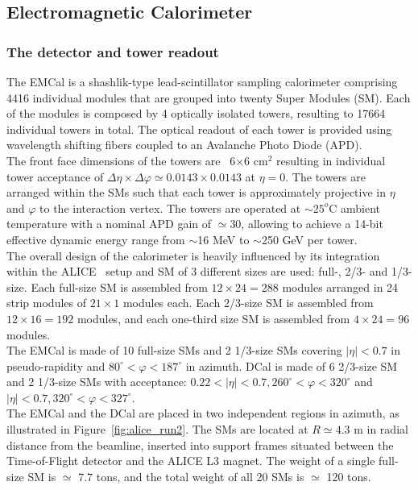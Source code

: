 \subsection{Electromagnetic Calorimeter}
%
\subsubsection{The detector and tower readout}
The EMCal is a shashlik-type lead-scintillator sampling calorimeter comprising 4416 individual modules that are grouped into 
twenty Super Modules (SM). Each of the modules is composed by 4 optically isolated towers, resulting to 17664 individual towers in total.  
The optical readout of each tower is provided using wavelength shifting fibers coupled to an Avalanche Photo Diode (APD). \\
%
The front face dimensions of the towers are ~6$\times$6 cm$^{2}$ resulting in individual tower acceptance of $\Delta  \eta \times \Delta  \varphi \simeq 0.0143 \times 0.0143$ at $\eta = 0$. The towers are arranged within the SMs such that each tower is approximately 
projective in $\eta$ and $\varphi$  to the interaction vertex. The towers are operated at $\sim25^{o}$C ambient temperature with a nominal APD gain of $\simeq$30, allowing to achieve a 14-bit effective dynamic energy range from $\sim$16 MeV to $\sim$250 GeV per tower. \\
%
The overall design of the calorimeter is heavily influenced by its integration within the ALICE~\cite{Aamodt:2008zz} setup and SM of 3 different sizes are used: full-, 2/3- and 1/3- size. 
Each full-size SM is assembled from $12\times24= 288$ modules arranged in 24 strip modules of $21\times1$ modules each. Each 2/3-size SM is assembled from $12\times16=192$ modules, and 
each one-third size SM is assembled from $4\times24=96$ modules.\\
The EMCal is made of 10 full-size SMs and 2 1/3-size SMs covering $|\eta|<0.7$ in pseudo-rapidity  and $80^{\circ} < \varphi < 187^{\circ}$ in azimuth.  
DCal is made of 6 2/3-size SM and 2 1/3-size SMs with acceptance:  $0.22 < |\eta| < 0.7, 260^{\circ} < \varphi < 320^{\circ} $ and $|\eta| < 0.7, 320^{\circ} < \varphi < 327^{\circ}$. \\
%
The EMCal and the DCal are placed in two independent regions in azimuth, as illustrated in Figure~\ref{fig:alice_run2}. The SMs are located at $R\simeq 4.3$ m in radial distance from the beamline, inserted into support frames situated between the Time-of-Flight  detector and the ALICE L3 magnet. The weight of a single full-size SM is $\simeq$ 7.7 tons, and the total weight of all 20 SMs is $\simeq$ 120 tons. 

